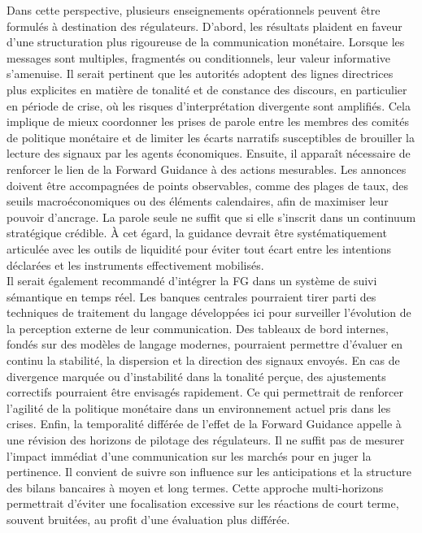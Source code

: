 Dans cette perspective, plusieurs enseignements opérationnels peuvent être formulés à destination des régulateurs. D’abord, les résultats plaident en faveur d’une structuration plus rigoureuse de la communication monétaire. Lorsque les messages sont multiples, fragmentés ou conditionnels, leur valeur informative s’amenuise. Il serait pertinent que les autorités adoptent des lignes directrices plus explicites en matière de tonalité et de constance des discours, en particulier en période de crise, où les risques d’interprétation divergente sont amplifiés. Cela implique de mieux coordonner les prises de parole entre les membres des comités de politique monétaire et de limiter les écarts narratifs susceptibles de brouiller la lecture des signaux par les agents économiques. Ensuite, il apparaît nécessaire de renforcer le lien  de la Forward Guidance à des actions mesurables. Les annonces doivent être accompagnées de points observables, comme des plages de taux, des seuils macroéconomiques ou des éléments calendaires, afin de maximiser leur pouvoir d’ancrage. La parole seule ne suffit que si elle s’inscrit dans un continuum stratégique crédible. À cet égard, la guidance devrait être systématiquement articulée avec les outils de liquidité pour éviter tout écart entre les intentions déclarées et les instruments effectivement mobilisés.\\

Il serait également recommandé d’intégrer la FG dans un système de suivi sémantique en temps réel. Les banques centrales pourraient tirer parti des techniques de traitement du langage développées ici pour surveiller l’évolution de la perception externe de leur communication. Des tableaux de bord internes, fondés sur des modèles de langage modernes, pourraient permettre d’évaluer en continu la stabilité, la dispersion et la direction des signaux envoyés. En cas de divergence marquée ou d’instabilité dans la tonalité perçue, des ajustements correctifs pourraient être envisagés rapidement. Ce qui permettrait de renforcer l’agilité de la politique monétaire dans un environnement actuel pris dans les crises. Enfin, la temporalité différée de l’effet de la Forward Guidance appelle à une révision des horizons de pilotage des régulateurs. Il ne suffit pas de mesurer l’impact immédiat d’une communication sur les marchés pour en juger la pertinence. Il convient de suivre son influence sur les anticipations et la structure des bilans bancaires à moyen et long termes. Cette approche multi-horizons permettrait d’éviter une focalisation excessive sur les réactions de court terme, souvent bruitées, au profit d’une évaluation plus différée.\\

